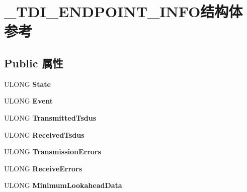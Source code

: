 \hypertarget{struct___t_d_i___e_n_d_p_o_i_n_t___i_n_f_o}{}\section{\+\_\+\+T\+D\+I\+\_\+\+E\+N\+D\+P\+O\+I\+N\+T\+\_\+\+I\+N\+F\+O结构体 参考}
\label{struct___t_d_i___e_n_d_p_o_i_n_t___i_n_f_o}
\subsection*{Public 属性}
\begin{DoxyCompactItemize}
\item 
\mbox{\label{struct___t_d_i___e_n_d_p_o_i_n_t___i_n_f_o_a103e146b91bf42f4bf00200f19a15e8f}} 
U\+L\+O\+NG {\bfseries State}
\item 
\mbox{\label{struct___t_d_i___e_n_d_p_o_i_n_t___i_n_f_o_a7afcd75faca15ff9412df2dd4dde5b18}} 
U\+L\+O\+NG {\bfseries Event}
\item 
\mbox{\label{struct___t_d_i___e_n_d_p_o_i_n_t___i_n_f_o_a2f05905b5a95f5dfb747e8221848b435}} 
U\+L\+O\+NG {\bfseries Transmitted\+Tsdus}
\item 
\mbox{\label{struct___t_d_i___e_n_d_p_o_i_n_t___i_n_f_o_a2223fd6449cff750fff265c3bfddc651}} 
U\+L\+O\+NG {\bfseries Received\+Tsdus}
\item 
\mbox{\label{struct___t_d_i___e_n_d_p_o_i_n_t___i_n_f_o_a4daa3c4f6e3ab2baf33ec47f1de6f546}} 
U\+L\+O\+NG {\bfseries Transmission\+Errors}
\item 
\mbox{\label{struct___t_d_i___e_n_d_p_o_i_n_t___i_n_f_o_ae14bcf9df889d56e65e16dd24c11966c}} 
U\+L\+O\+NG {\bfseries Receive\+Errors}
\item 
\mbox{\label{struct___t_d_i___e_n_d_p_o_i_n_t___i_n_f_o_a1c4ec5acafe179b5edc263d2017e42fa}} 
U\+L\+O\+NG {\bfseries Minimum\+Lookahead\+Data}

\end{DoxyCompactItemize}
